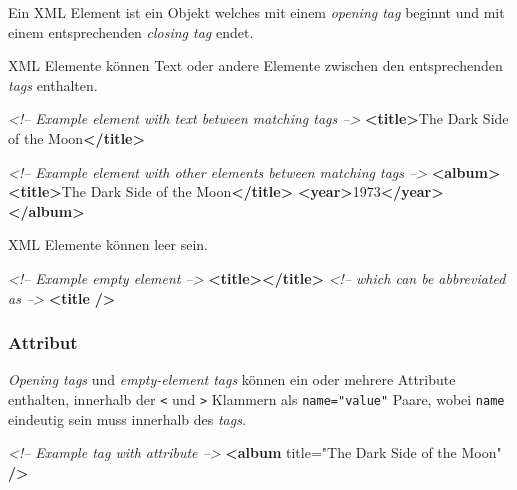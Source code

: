 \documentclass[11pt]{article}
\newenvironment{Shaded}{}{}
\newcommand{\KeywordTok}[1]{\textcolor[rgb]{0.00,0.44,0.13}{\textbf{{#1}}}}
\newcommand{\StringTok}[1]{\textcolor[rgb]{0.25,0.44,0.63}{{#1}}}
\newcommand{\CommentTok}[1]{\textcolor[rgb]{0.38,0.63,0.69}{\textit{{#1}}}}
\newcommand{\OtherTok}[1]{\textcolor[rgb]{0.00,0.44,0.13}{{#1}}}
\newcommand{\NormalTok}[1]{{#1}}
\begin{document}
Ein XML Element ist ein Objekt welches mit einem \emph{opening tag}
beginnt und mit einem entsprechenden \emph{closing tag} endet.

XML Elemente können Text oder andere Elemente zwischen den
entsprechenden \emph{tags} enthalten.

\begin{Shaded}
\begin{Highlighting}[]
\CommentTok{<!-- Example element with text between matching tags -->}
\KeywordTok{<title>}\NormalTok{The Dark Side of the Moon}\KeywordTok{</title>}
\end{Highlighting}
\end{Shaded}

\begin{Shaded}
\begin{Highlighting}[]
\CommentTok{<!-- Example element with other elements between matching tags -->} 
\KeywordTok{<album>}
    \KeywordTok{<title>}\NormalTok{The Dark Side of the Moon}\KeywordTok{</title>}
    \KeywordTok{<year>}\NormalTok{1973}\KeywordTok{</year>}
\KeywordTok{</album>}
\end{Highlighting}
\end{Shaded}

XML Elemente können leer sein.

\begin{Shaded}
\begin{Highlighting}[]
\CommentTok{<!-- Example empty element -->}
\KeywordTok{<title></title>}
\CommentTok{<!-- which can be abbreviated as -->}
\KeywordTok{<title} \KeywordTok{/>}
\end{Highlighting}
\end{Shaded}

    \subsubsection{Attribut}\label{attribut}

\emph{Opening tags} und \emph{empty-element tags} können ein oder
mehrere Attribute enthalten, innerhalb der \texttt{\textless{}} und
\texttt{\textgreater{}} Klammern als \texttt{name="value"} Paare, wobei
\texttt{name} eindeutig sein muss innerhalb des \emph{tags}.

\begin{Shaded}
\begin{Highlighting}[]
\CommentTok{<!-- Example tag with attribute -->}
\KeywordTok{<album}\OtherTok{ title=}\StringTok{"The Dark Side of the Moon"} \KeywordTok{/>}
\end{Highlighting}
\end{Shaded}
\end{document}
